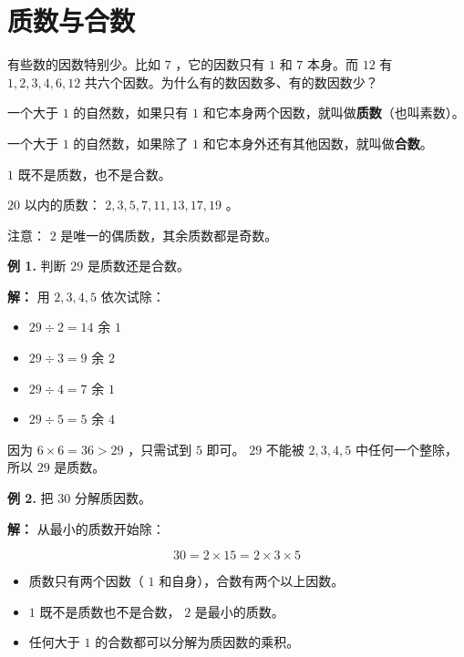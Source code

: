 \section*{质数与合数}


\begin{explore}


有些数的因数特别少。比如 $7$ ，它的因数只有 $1$ 和 $7$ 本身。而 $12$ 有 $1, 2, 3, 4, 6, 12$ 共六个因数。为什么有的数因数多、有的数因数少？

\end{explore}

\begin{understand}


一个大于 $1$ 的自然数，如果只有 $1$ 和它本身两个因数，就叫做\textbf{质数}（也叫素数）。

一个大于 $1$ 的自然数，如果除了 $1$ 和它本身外还有其他因数，就叫做\textbf{合数}。

$1$ 既不是质数，也不是合数。

$20$ 以内的质数： $2, 3, 5, 7, 11, 13, 17, 19$ 。

注意： $2$ 是唯一的偶质数，其余质数都是奇数。

\end{understand}

\begin{workedexamples}


\textbf{例 1.} 判断 $29$ 是质数还是合数。

\textbf{解：} 用 $2, 3, 4, 5$ 依次试除：
\begin{itemize}
  \item $29 \div 2 = 14$ 余 $1$
  \item $29 \div 3 = 9$ 余 $2$
  \item $29 \div 4 = 7$ 余 $1$
  \item $29 \div 5 = 5$ 余 $4$
\end{itemize}


因为 $6 \times 6 = 36 > 29$ ，只需试到 $5$ 即可。 $29$ 不能被 $2, 3, 4, 5$ 中任何一个整除，所以 $29$ 是质数。

\textbf{例 2.} 把 $30$ 分解质因数。

\textbf{解：} 从最小的质数开始除：

\[
30 = 2 \times 15 = 2 \times 3 \times 5
\]


\end{workedexamples}

\begin{keytakeaway}


\begin{itemize}
  \item 质数只有两个因数（ $1$ 和自身），合数有两个以上因数。
  \item $1$ 既不是质数也不是合数， $2$ 是最小的质数。
  \item 任何大于 $1$ 的合数都可以分解为质因数的乘积。
\end{itemize}


\end{keytakeaway}

